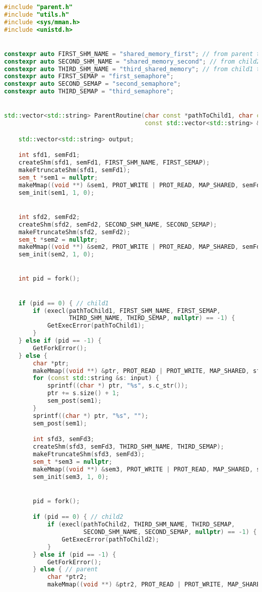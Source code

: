 \documentclass[pdf, unicode, 12pt, a4paper,oneside,fleqn]{article}
\begin{document}
\begin{lstlisting}[language=C++]
#include "parent.h"
#include "utils.h"
#include <sys/mman.h>
#include <unistd.h>


constexpr auto FIRST_SHM_NAME = "shared_memory_first"; // from parent to child1
constexpr auto SECOND_SHM_NAME = "shared_memory_second"; // from child2 to parent
constexpr auto THIRD_SHM_NAME = "third_shared_memory"; // from child1 to child2
constexpr auto FIRST_SEMAP = "first_semaphore";
constexpr auto SECOND_SEMAP = "second_semaphore";
constexpr auto THIRD_SEMAP = "third_semaphore";


std::vector<std::string> ParentRoutine(char const *pathToChild1, char const *pathToChild2,
                                       const std::vector<std::string> &input) {

    std::vector<std::string> output;

    int sfd1, semFd1;
    createShm(sfd1, semFd1, FIRST_SHM_NAME, FIRST_SEMAP);
    makeFtruncateShm(sfd1, semFd1);
    sem_t *sem1 = nullptr;
    makeMmap((void **) &sem1, PROT_WRITE | PROT_READ, MAP_SHARED, semFd1);
    sem_init(sem1, 1, 0);


    int sfd2, semFd2;
    createShm(sfd2, semFd2, SECOND_SHM_NAME, SECOND_SEMAP);
    makeFtruncateShm(sfd2, semFd2);
    sem_t *sem2 = nullptr;
    makeMmap((void **) &sem2, PROT_WRITE | PROT_READ, MAP_SHARED, semFd2);
    sem_init(sem2, 1, 0);


    int pid = fork();


    if (pid == 0) { // child1
        if (execl(pathToChild1, FIRST_SHM_NAME, FIRST_SEMAP,
                  THIRD_SHM_NAME, THIRD_SEMAP, nullptr) == -1) {
            GetExecError(pathToChild1);
        }
    } else if (pid == -1) {
        GetForkError();
    } else {
        char *ptr;
        makeMmap((void **) &ptr, PROT_READ | PROT_WRITE, MAP_SHARED, sfd1);
        for (const std::string &s: input) {
            sprintf((char *) ptr, "%s", s.c_str());
            ptr += s.size() + 1;
            sem_post(sem1);
        }
        sprintf((char *) ptr, "%s", "");
        sem_post(sem1);

        int sfd3, semFd3;
        createShm(sfd3, semFd3, THIRD_SHM_NAME, THIRD_SEMAP);
        makeFtruncateShm(sfd3, semFd3);
        sem_t *sem3 = nullptr;
        makeMmap((void **) &sem3, PROT_WRITE | PROT_READ, MAP_SHARED, semFd3);
        sem_init(sem3, 1, 0);


        pid = fork();

        if (pid == 0) { // child2
            if (execl(pathToChild2, THIRD_SHM_NAME, THIRD_SEMAP,
                      SECOND_SHM_NAME, SECOND_SEMAP, nullptr) == -1) {
                GetExecError(pathToChild2);
            }
        } else if (pid == -1) {
            GetForkError();
        } else { // parent
            char *ptr2;
            makeMmap((void **) &ptr2, PROT_READ | PROT_WRITE, MAP_SHARED, sfd2);


\end{lstlisting}
\end{document}
